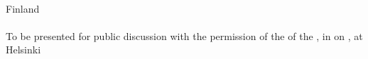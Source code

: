 





\frontmatter

\begin{titlepage}
    \begin{center}
         \hfill {}\\
        \vspace{2.5pc}
        \textucsf{\hipseriesnumber}\\
        \vspace{7.5pc}
        {\titlestyle\Large \thesistitle}\\
        \vspace{2.5pc}
        \thesisauthor\\
        \vspace{7.5pc}
        \department\\
        \institution\\
        Finland\\
        \vspace{7.5pc}
        \\
        \vspace{1pc}
        To be presented for public discussion with the permission of the \faculty{} of the \institution, in  on , at \\
        \vfill
        Helsinki \thesisyear
    \end{center}
\end{titlepage}

